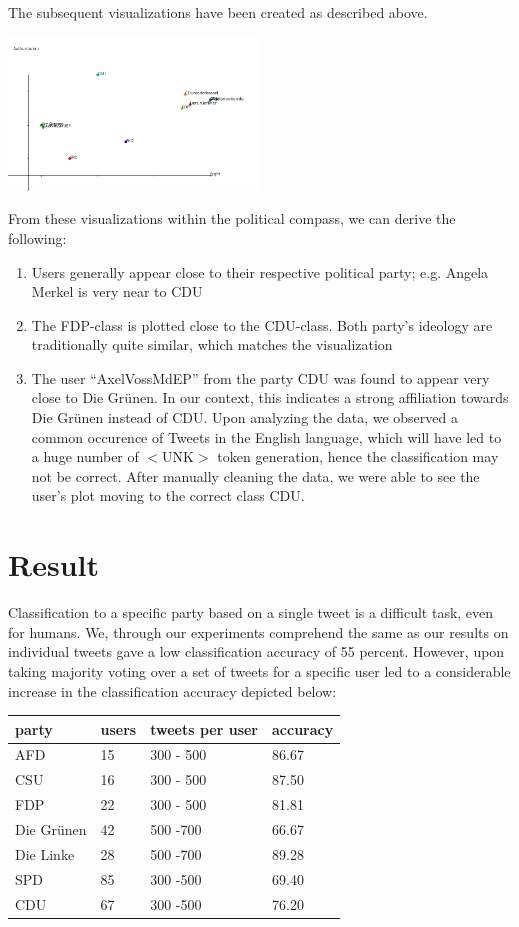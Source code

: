 \documentclass[10pt, oneside]{article}
\begin{document}
\begin{multicols}{2}
The subsequent visualizations have been created as described above.

\includegraphics[width=0.5\textwidth]{images/Political_Compass.png}

From these visualizations within the political compass, we can derive the following:

\begin{enumerate}
	\item Users generally appear close to their respective political party; e.g. Angela Merkel is very near to CDU
	\item The FDP-class is plotted close to the CDU-class. Both party's ideology are traditionally quite similar, which matches the visualization
	\item The user ``AxelVossMdEP'' from the party CDU was found to appear very close to Die Grünen. In our context, this indicates a strong affiliation towards Die Grünen instead of CDU. Upon analyzing the data, we observed a common occurence  of Tweets in the English language, which will have led to a huge number of $<$UNK$>$ token generation, hence the classification may not be correct. After manually cleaning the data, we were able to see the user's plot moving to the correct class CDU.
\end{enumerate}

\section{Result}
Classification to a specific party based on a single tweet is a difficult task, even for humans. We, through our experiments comprehend the same as our results on individual tweets gave a low classification accuracy of 55 percent.
However, upon taking majority voting over a set of tweets for a specific user led to a considerable increase in the classification accuracy depicted below:
\begin{center}
	\begin{tabular}{|l|l|l|l|}
	\hline
	\textbf{party} & \textbf{users} & \textbf{tweets per user} & \textbf{accuracy} \\ \hline
	AFD & 15 & 300 - 500 & 86.67 \\
	CSU & 16 & 300 - 500 & 87.50 \\
	FDP & 22 & 300 - 500 & 81.81 \\
	Die Grünen & 42 & 500 -700 & 66.67 \\
	Die Linke & 28 & 500 -700 & 89.28 \\
	SPD & 85 & 300 -500 & 69.40 \\
	CDU & 67 & 300 -500 & 76.20 \\
	\hline
	\end{tabular}
\end{center}



\end{multicols}
\end{document}
